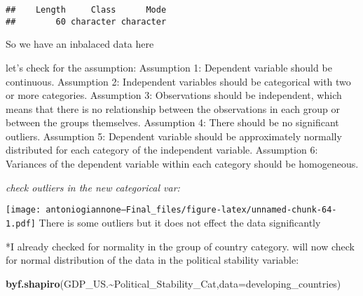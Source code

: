 \documentclass[
]{article}
\newenvironment{Shaded}{\begin{snugshade}}{\end{snugshade}}
\newcommand{\AttributeTok}[1]{\textcolor[rgb]{0.13,0.29,0.53}{#1}}
\newcommand{\FunctionTok}[1]{\textcolor[rgb]{0.13,0.29,0.53}{\textbf{#1}}}
\newcommand{\NormalTok}[1]{#1}
\newcommand{\SpecialCharTok}[1]{\textcolor[rgb]{0.81,0.36,0.00}{\textbf{#1}}}
\newcommand{\StringTok}[1]{\textcolor[rgb]{0.31,0.60,0.02}{#1}}
\begin{document}
\begin{verbatim}
##    Length     Class      Mode 
##        60 character character
\end{verbatim}

So we have an inbalaced data here

let's check for the assumption: Assumption 1: Dependent variable should
be continuous. Assumption 2: Independent variables should be categorical
with two or more categories. Assumption 3: Observations should be
independent, which means that there is no relationship between the
observations in each group or between the groups themselves. Assumption
4: There should be no significant outliers. Assumption 5: Dependent
variable should be approximately normally distributed for each category
of the independent variable. Assumption 6: Variances of the dependent
variable within each category should be homogeneous.

\emph{check outliers in the new categorical var:}

\begin{Shaded}
\end{Shaded}

\texttt{[image: antoniogiannone---Final\_files/figure-latex/unnamed-chunk-64-1.pdf]}
There is some outliers but it does not effect the data significantly

*I already checked for normality in the group of country category. will
now check for normal distribution of the data in the political stability
variable:

\begin{Shaded}
\begin{Highlighting}[]
\FunctionTok{byf.shapiro}\NormalTok{(GDP\_US.}\SpecialCharTok{\textasciitilde{}}\NormalTok{Political\_Stability\_Cat,}\AttributeTok{data=}\NormalTok{developing\_countries)}
\end{Highlighting}
\end{Shaded}
\end{document}
